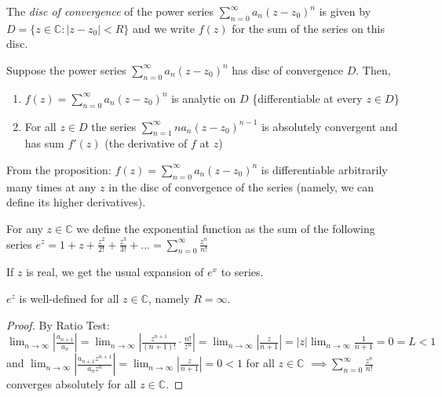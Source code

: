 \documentclass[12pt]{article}
\begin{document}
\begin{definition}
The \emph{disc of convergence} of the power series $\sum_{n=0}^\infty a_n(z-z_0)^n$ is given by $D = \{z \in \mathbb{C}: |z-z_0| < R\}$ and we write $f(z)$ for the sum of the series on this disc.
\end{definition}

\begin{proposition}
Suppose the power series $\sum_{n=0}^\infty a_n(z-z_0)^n$ has disc of convergence $D$. Then,
\begin{enumerate}
    \item $f(z) = \sum_{n=0}^\infty a_n(z-z_0)^n$ is analytic on $D$ \{differentiable at every $z \in D$\}
    \item For all $z \in D$ the series $\sum_{n=1}^\infty na_n(z-z_0)^{n-1}$ is absolutely convergent and has sum $f'(z)$ (the derivative of $f$ at $z$)
\end{enumerate}
\end{proposition}

\begin{remark}
From the proposition: $f(z) = \sum_{n=0}^\infty a_n(z-z_0)^n$ is differentiable arbitrarily many times at any $z$ in the disc of convergence of the series (namely, we can define its higher derivatives).
\end{remark}

\begin{definition}
For any $z \in \mathbb{C}$ we define the exponential function as the sum of the following series
$e^z = 1 + z + \frac{z^2}{2!} + \frac{z^3}{3!} + ... = \sum_{n=0}^\infty \frac{z^n}{n!}$
\end{definition}

If $z$ is real, we get the usual expansion of $e^x$ to series.

\begin{remark}
$e^z$ is well-defined for all $z \in \mathbb{C}$, namely $R = \infty$.
\end{remark}

\begin{proof}
By Ratio Test:
$\lim_{n\to\infty} |\frac{a_{n+1}}{a_n}| = \lim_{n\to\infty} |\frac{z^{n+1}}{(n+1)!} \cdot \frac{n!}{z^n}| = \lim_{n\to\infty} |\frac{z}{n+1}| = |z|\lim_{n\to\infty} \frac{1}{n+1} = 0 = L < 1$
and $\lim_{n\to\infty} |\frac{a_{n+1}z^{n+1}}{a_nz^n}| = \lim_{n\to\infty} |\frac{z}{n+1}| = 0 < 1$ for all $z \in \mathbb{C}$
$\implies \sum_{n=0}^\infty \frac{z^n}{n!}$ converges absolutely for all $z \in \mathbb{C}$.
\end{proof}
\end{document}
